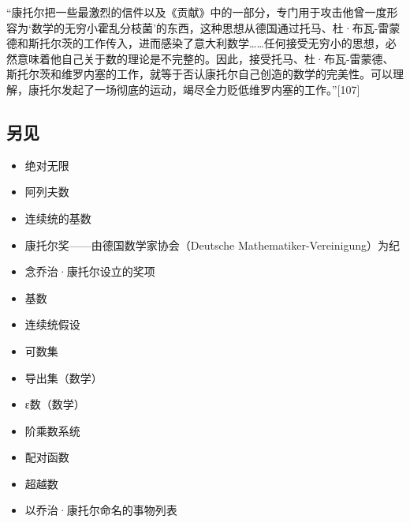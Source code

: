 “康托尔把一些最激烈的信件以及《贡献》中的一部分，专门用于攻击他曾一度形容为‘数学的无穷小霍乱分枝菌’的东西，这种思想从德国通过托马、杜·布瓦-雷蒙德和斯托尔茨的工作传入，进而感染了意大利数学……任何接受无穷小的思想，必然意味着他自己关于数的理论是不完整的。因此，接受托马、杜·布瓦-雷蒙德、斯托尔茨和维罗内塞的工作，就等于否认康托尔自己创造的数学的完美性。可以理解，康托尔发起了一场彻底的运动，竭尽全力贬低维罗内塞的工作。”[107]
\subsection{另见}
\begin{itemize}
\item 绝对无限  
\item 阿列夫数  
\item 连续统的基数  
\item 康托尔奖——由德国数学家协会（Deutsche Mathematiker-Vereinigung）为纪\item 念乔治·康托尔设立的奖项  
\item 基数  
\item 连续统假设  
\item 可数集  
\item 导出集（数学）  
\item ε数（数学）  
\item 阶乘数系统  
\item 配对函数  
\item 超越数  
\item 以乔治·康托尔命名的事物列表
\end{itemize}
